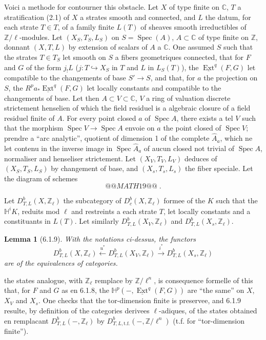 \documentclass[12pt,a4paper]{article}
\theoremstyle{plain}
\newtheorem{lemma}[theorem]{Lemma}
\theoremstyle{definition}
\theoremstyle{remark}
\DeclareMathOperator{\Ext}{Ext}
\DeclareMathOperator{\Spec}{Spec}
\newcommand{\CC}{\mathbb{C}}
\newcommand{\HH}{\mathbb{H}}
\newcommand{\ZZ}{\mathbb{Z}}
\begin{document}
Voici a methode for contourner this obstacle. Let $X$ of type finite on $\CC$, $T$ a stratification (2.1) of $X$ a strates smooth and connected, and $L$ the datum, for each strate $T \in T$, of a family finite $L(T)$ of sheaves smooth irreductibles of $\ZZ/\ell$-modules. Let $(X_S, T_S, L_S)$ on $S = \Spec(A)$, $A \subset \CC$ of type finite on $\ZZ$, donnant $(X, T, L)$ by extension of scalars of $A$ a $\CC$. One assumed $S$ such that the strates $T \in T_S$ let smooth on $S$ a fibers geometriques connected, that for $F$ and $G$ of the form $j_!L$ ($j: T \hookrightarrow X_S$ in $T$ and $L$ in $L_S(T)$), the $\underline{\Ext}^q(F, G)$ let compatible to the changements of base $S' \to S$, and that, for $a$ the projection on $S$, the $R^pa_*\underline{\Ext}^q(F, G)$ let locally constants and compatible to the changements of base. Let then $A \subset V \subset \CC$, $V$ a ring of valuation discrete strictement henselien of which the field residuel is a algebraic closure of a field residuel finite of $A$. For every point closed $a$ of $\Spec A$, there exists a tel $V$ such that the morphism $\Spec V \to \Spec A$ envoie on $a$ the point closed of $\Spec V$; prendre a ``arc analytic'', quotient of dimension 1 of the complete $\hat{A}_a$, which ne let contenu in the inverse image in $\Spec \hat{A}_a$ of aucun closed not trivial of $\Spec A$, normaliser and henseliser strictement. Let $(X_V, T_V, L_V)$ deduces of $(X_S, T_S, L_S)$ by changement of base, and $(X_s, T_s, L_s)$ the fiber speciale. Let the diagram of schemes
\[
@@MATH19@@\;.
\]

Let $D^b_{T, L}(X, \ZZ_{\ell})$ the subcategory of $D^b_c(X, \ZZ_{\ell})$ formee of the $K$ such that the $\HH^iK$, reduits mod $\ell$ and restreints a each strate $T$, let locally constants and a constituants in $L(T)$. Let similarly $D^b_{T, L}(X_V, \ZZ_{\ell})$ and $D^b_{T, L}(X_s, \ZZ_{\ell})$.

\begin{lemma}[6.1.9]
With the notations ci-dessus, the functors
\[
D^b_{T, L}(X, \ZZ_{\ell}) \xleftarrow{u^*} D^b_{T, L}(X_V, \ZZ_{\ell}) \xrightarrow{i^*} D^b_{T, L}(X_s, \ZZ_{\ell})
\]
are of the equivalences of categories.
\end{lemma}

the states analogue, with $\ZZ_{\ell}$ remplace by $\ZZ/\ell^n$, is consequence formelle of this that, for $F$ and $G$ as en 6.1.8, the $\HH^p(-, \underline{\Ext}^q(F, G))$ are ``the same'' on $X$, $X_V$ and $X_s$. One checks that the tor-dimension finite is preservee, and 6.1.9 resulte, by definition of the categories derivees $\ell$-adiques, of the states obtained en remplacant $D^b_{T, L}(-, \ZZ_{\ell})$ by $D^b_{T, L, \text{t.f.}}(-, \ZZ/\ell^n)$ (t.f. for ``tor-dimension finite'').
\end{document}
